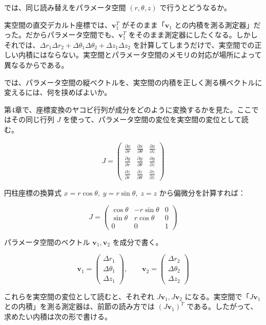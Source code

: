 \documentclass[a4paper,12pt,openany]{book}
\begin{document}
では、同じ読み替えをパラメータ空間 \((r,\theta,z)\) で行うとどうなるか。

実空間の直交デカルト座標では、\(\mathbf{v}_1^T\)
がそのまま「\(\mathbf{v}_1\)
との内積を測る測定器」だった。だからパラメータ空間でも、\(\mathbf{v}_1^T\)
をそのまま測定器にしたくなる。しかしそれでは、\(\Delta r_1 \Delta r_2 + \Delta\theta_1 \Delta\theta_2 + \Delta z_1 \Delta z_2\)
を計算してしまうだけで、実空間での正しい内積にはならない。実空間とパラメータ空間のメモリの対応が場所によって異なるからである。

では、パラメータ空間の縦ベクトルを、実空間の内積を正しく測る横ベクトルに変えるには、何を挟めばよいか。

第4章で、座標変換のヤコビ行列が成分をどのように変換するかを見た。ここではその同じ行列
\(J\) を使って、パラメータ空間の変位を実空間の変位として読む。

\[J = \begin{pmatrix}
\frac{\partial x}{\partial r} & \frac{\partial x}{\partial \theta} & \frac{\partial x}{\partial z} \\
\frac{\partial y}{\partial r} & \frac{\partial y}{\partial \theta} & \frac{\partial y}{\partial z} \\
\frac{\partial z}{\partial r} & \frac{\partial z}{\partial \theta} & \frac{\partial z}{\partial z}
\end{pmatrix}\]

円柱座標の換算式 \(x = r\cos\theta,\; y = r\sin\theta,\; z = z\)
から偏微分を計算すれば：

\[J = \begin{pmatrix}
\cos\theta & -r\sin\theta & 0 \\
\sin\theta & r\cos\theta & 0 \\
0 & 0 & 1
\end{pmatrix}\]

パラメータ空間のベクトル \(\mathbf{v}_1, \mathbf{v}_2\) を成分で書く。

\[\mathbf{v}_1 = \begin{pmatrix} \Delta r_1 \\ \Delta\theta_1 \\ \Delta z_1 \end{pmatrix},\qquad \mathbf{v}_2 = \begin{pmatrix} \Delta r_2 \\ \Delta\theta_2 \\ \Delta z_2 \end{pmatrix}\]

これらを実空間の変位として読むと、それぞれ
\(J\mathbf{v}_1, J\mathbf{v}_2\) になる。実空間で「\(J\mathbf{v}_1\)
との内積」を測る測定器は、前節の読み方では \((J\mathbf{v}_1)^T\)
である。したがって、求めたい内積は次の形で書ける。
\end{document}
